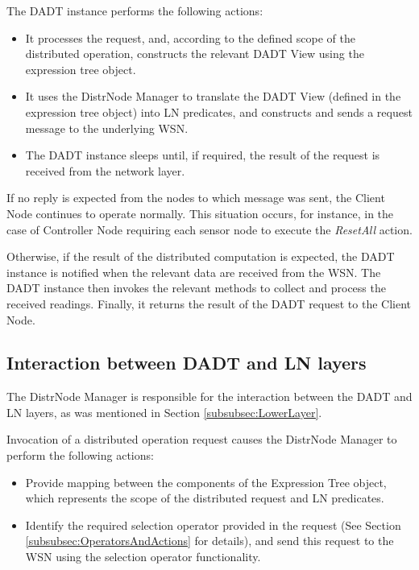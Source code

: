The DADT instance performs the following actions:
  \begin{itemize} 
    \item It processes the request, and, according to the defined scope of the
    distributed operation, constructs the relevant DADT View using the
    expression tree object.
    \item It uses the DistrNode Manager to translate the DADT View
    (defined in the expression tree object) into LN predicates, and constructs and sends a request message to
    the underlying WSN.
    \item The DADT instance sleeps until, if required, the result of
    the request is received from the network layer.
  \end{itemize}
  
If no reply is expected from the nodes to which message was sent, the
Client Node continues to operate normally. This situation occurs, for instance,
in the case of Controller Node requiring each sensor node to execute the \emph{ResetAll} action.
 
Otherwise, if the result of the distributed computation is expected, the DADT
instance is notified when the relevant data are received from the WSN.
The DADT instance then invokes the relevant methods to collect and process the received
readings. Finally, it returns the result of the DADT request to
the Client Node.

\subsection{Interaction between DADT and LN layers} \label{subsec:DADTLNMapping}

The DistrNode Manager is responsible for the interaction between the DADT and LN
layers, as was mentioned in Section \ref{subsubsec:LowerLayer}.

Invocation of a distributed operation request causes the DistrNode Manager
to perform the following actions:
\begin{itemize}
  \item Provide mapping between the components of the Expression Tree object,
  which represents the scope of the distributed request and LN predicates.
  \item Identify the required selection operator provided in the request
  (See Section \ref{subsubsec:OperatorsAndActions} for details), and send
  this request to the WSN using the selection operator functionality.
\end{itemize}

